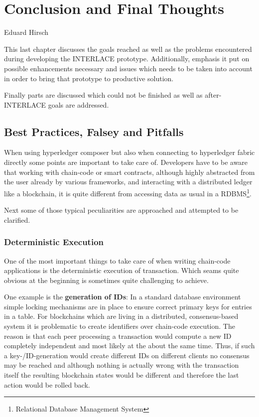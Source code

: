 \chapter{Conclusion and Final Thoughts}
\label{ch:conclusion}

\vspace{-1cm}
\begin{center}
Eduard Hirsch
\end{center}

This last chapter discusses the goals reached as well as the problems encountered during developing the INTERLACE prototype. Additionally, emphasis it put on possible enhancements necessary and issues which needs to be taken into account in order to bring that prototype to productive solution.

Finally parts are discussed which could not be finished as well as after-INTERLACE goals are addressed.

\section{Best Practices, Falsey and Pitfalls}

When using hyperledger composer but also when connecting to hyperledger fabric directly some points are important to take care of. Developers have to be aware that working with chain-code or smart contracts, although highly abstracted from the user already by various frameworks, and interacting with a distributed ledger like a blockchain, it is quite different from accessing data as usual in a RDBMS\footnote{Relational Database Management System}.

Next some of those typical peculiarities are approached and attempted to be clarified.

\subsection{Deterministic Execution}

One of the most important things to take care of when writing chain-code applications is the deterministic execution of transaction. Which seams quite obvious at the beginning is sometimes quite challenging to achieve.

One example is the \textbf{generation of IDs}:  In a standard database environment simple locking mechanisms are in place to ensure correct primary keys for entries in a table. For blockchains  which are living in a distributed, consensus-based system it is problematic to create identifiers over chain-code execution. The reason is that each peer processing a transaction would compute a new ID completely independent and most likely at the about the same time. Thus, if such a key-/ID-generation would create different IDs on different clients no consensus may be reached and although nothing is actually wrong with the transaction itself the resulting blockchain states would be different and therefore the last action would be rolled back.

